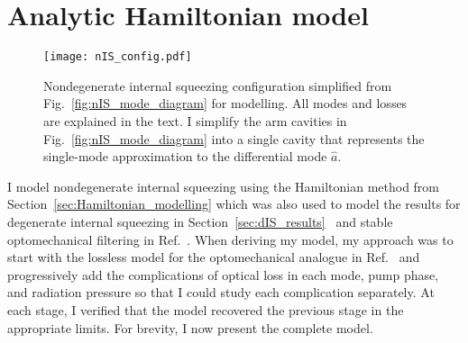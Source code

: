 \section{Analytic Hamiltonian model}
\label{sec:nIS_model}

\begin{figure}[ht]
	\centering
	\texttt{[image: nIS\_config.pdf]}
	\caption{Nondegenerate internal squeezing configuration simplified from Fig.~\ref{fig:nIS_mode_diagram} for modelling. All modes and losses are explained in the text. I simplify the arm cavities in Fig.~\ref{fig:nIS_mode_diagram} into a single cavity that represents the single-mode approximation to the differential mode $\hat a$.}
	\label{fig:nIS_config}
\end{figure}

I model nondegenerate internal squeezing using the Hamiltonian method from Section~\ref{sec:Hamiltonian_modelling} which was also used to model the results for degenerate internal squeezing in Section~\ref{sec:dIS_results}~\cite{korobkoQuantumExpanderGravitationalwave2019} and stable optomechanical filtering in Ref.~\cite{liBroadbandSensitivityImprovement2020}. %
When deriving my model, my approach was to start with the lossless model for the optomechanical analogue in Ref.~\cite{liBroadbandSensitivityImprovement2020} and progressively add the complications of optical loss in each mode, pump phase, and radiation pressure so that I could study each complication separately. At each stage, I verified that the model recovered the previous stage in the appropriate limits. For brevity, I now present the complete model.

